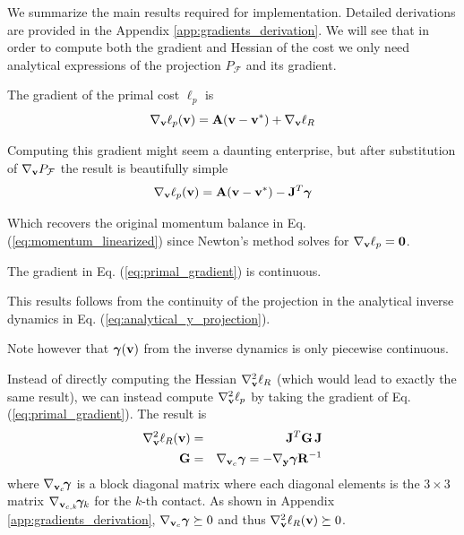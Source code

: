 We summarize the main results required for implementation. Detailed derivations
are provided in the Appendix \ref{app:gradients_derivation}. We will see that in
order to compute both the gradient and Hessian of the cost we only need
analytical expressions of the projection $P_\mathcal{F}$ and its gradient.

The gradient of the primal cost $\ell_p$ is
\begin{equation}
	\nabla_{\mathbf{v}}\ell_p({\mathbf{v}}) = {\mathbf{A}}({\mathbf{v}}-{\mathbf{v}}^*) + \nabla_{\mathbf{v}}\ell_R
\end{equation}

Computing this gradient might seem a daunting enterprise, but after substitution
of $\nabla_{\mathbf{v}}P_\mathcal{F}$ the result is beautifully simple
\begin{equation}
	\nabla_\mf{v}\ell_p(\mf{v}) = \mf{A}(\mf{v}-\mf{v}^*) - \mf{J}^T\bgamma
	\label{eq:primal_gradient}
\end{equation}

Which recovers the original momentum balance in Eq.
(\ref{eq:momentum_linearized}) since Newton's method solves for
$\nabla_{\mathbf{v}}\ell_p={\mathbf{0}}$.

\begin{lemma}
	The gradient in Eq. (\ref{eq:primal_gradient}) is continuous.
\end{lemma}
\begin{IEEEproof}
	This results follows from the continuity of the projection in the analytical
	inverse dynamics in Eq. (\ref{eq:analytical_y_projection}).
\end{IEEEproof}
Note however that ${\bm\gamma}({\mathbf{v}})$ from the inverse dynamics is only piecewise
continuous.

Instead of directly computing the Hessian $\nabla_{\mathbf{v}}^2\ell_R$ (which would
lead to exactly the same result), we can instead compute $\nabla_{\mathbf{v}}^2\ell_p$
by taking the gradient of Eq. (\ref{eq:primal_gradient}). The result is
\begin{eqnarray}
	\nabla_\mf{v}^2\ell_R(\mf{v}) &=&
	\mf{J}^T\mf{G}\,\mf{J}\nonumber\\
	\mf{G} &=& \nabla_{\mf{v}_c}\bgamma = -\nabla_\mf{y}\bgamma \mf{R}^{-1}
	\label{eq:ellR_hessian}
\end{eqnarray}
where $\nabla_{{\mathbf{v}}_c}\!{\bm\gamma}$ is a block diagonal matrix where each
diagonal elements is the $3\times 3$ matrix
$\nabla_{{\mathbf{v}}_{c,k}}\!{\bm\gamma}_k$ for the $k\text{-th}$ contact. As shown in
Appendix \ref{app:gradients_derivation}, $\nabla_{{\mathbf{v}}_c}{\bm\gamma}\succeq 0$ and
thus $\nabla_{\mathbf{v}}^2\ell_R({\mathbf{v}})\succeq 0$.

